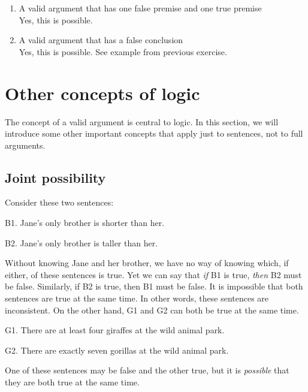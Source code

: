 \problempart
\begin{enumerate}[(1)]
\item A valid argument that has one false premise and one true premise\\
\noindent Yes, this is possible. 

\item A valid argument that has a false conclusion\\
Yes, this is possible. See example from previous exercise.\smallskip

\end{enumerate}


\chapter{Other concepts of logic}\label{s:BasicNotions}

The concept of a valid argument is central to logic. In this section, we will introduce some other important concepts that apply just to sentences, not to full arguments. 

\section{Joint possibility}\label{s:joint-poss}

Consider these two sentences:
	\begin{ebullet}
		\item[B1.] Jane's only brother is shorter than her.
		\item[B2.] Jane's only brother is taller than her.
	\end{ebullet}
Without knowing Jane and her brother, we have no way of knowing which, if either, of these sentences is true. Yet we can say that \emph{if} B1 is true, \emph{then} B2 must be false. Similarly, if B2 is true, then B1 must be false. It is impossible that both sentences are true at the same time. In other words, these sentences are inconsistent. On the other hand, G1 and G2 can both be true at the same time.
	\begin{ebullet}	
		\item[G1.] \label{MartianGiraffes} There are at least four giraffes at the wild animal park.
		\item[G2.] There are exactly seven gorillas at the wild animal park.
	\end{ebullet}
One of these sentences may be false and the other true, but it  is \textit{possible} that they are both true at the same time. 

